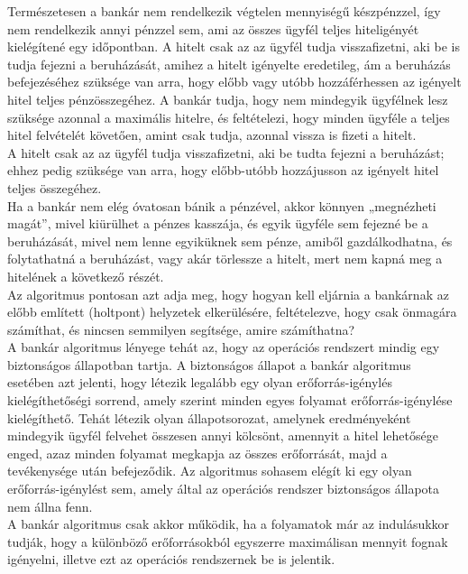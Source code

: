 \documentclass[tikz,12pt,margin=0px]{article}
\begin{document}
    \noindent Természetesen a bankár nem rendelkezik végtelen mennyiségű készpénzzel, így nem rendelkezik annyi pénzzel sem, ami az összes ügyfél teljes hiteligényét kielégítené egy időpontban. A hitelt csak az az ügyfél tudja visszafizetni, aki be is tudja fejezni a beruházását, amihez a hitelt igényelte eredetileg, ám a beruházás befejezéséhez szüksége van arra, hogy előbb vagy utóbb hozzáférhessen az igényelt hitel teljes pénzösszegéhez. A bankár tudja, hogy nem mindegyik ügyfélnek lesz szüksége azonnal a maximális hitelre, és feltételezi, hogy minden ügyféle a teljes hitel felvételét követően, amint csak tudja, azonnal vissza is fizeti a hitelt.\\

    \noindent A hitelt csak az az ügyfél tudja visszafizetni, aki be tudta fejezni a beruházást; ehhez pedig szüksége van arra, hogy előbb-utóbb hozzájusson az igényelt hitel teljes összegéhez.\\

    \noindent Ha a bankár nem elég óvatosan bánik a pénzével, akkor könnyen „megnézheti magát”, mivel kiürülhet a pénzes kasszája, és egyik ügyféle sem fejezné be a beruházását, mivel nem lenne egyiküknek sem pénze, amiből gazdálkodhatna, és folytathatná a beruházást, vagy akár törlessze a hitelt, mert nem kapná meg a hitelének a következő részét.\\

    \noindent Az algoritmus pontosan azt adja meg, hogy hogyan kell eljárnia a bankárnak az előbb említett (holtpont) helyzetek elkerülésére, feltételezve, hogy csak önmagára számíthat, és nincsen semmilyen segítsége, amire számíthatna?\\

    \noindent A bankár algoritmus lényege tehát az, hogy az operációs rendszert mindig egy biztonságos állapotban tartja. A biztonságos állapot a bankár algoritmus esetében azt jelenti, hogy létezik legalább egy olyan erőforrás-igénylés kielégíthetőségi sorrend, amely szerint minden egyes folyamat erőforrás-igénylése kielégíthető. Tehát létezik olyan állapotsorozat, amelynek eredményeként mindegyik ügyfél felvehet összesen annyi kölcsönt, amennyit a hitel lehetősége enged, azaz minden folyamat megkapja az összes erőforrását, majd a tevékenysége után befejeződik. Az algoritmus sohasem elégít ki egy olyan erőforrás-igénylést sem, amely által az operációs rendszer biztonságos állapota nem állna fenn.\\

    \noindent A bankár algoritmus csak akkor működik, ha a folyamatok már az indulásukkor tudják, hogy a különböző erőforrásokból egyszerre maximálisan mennyit fognak igényelni, illetve ezt az operációs rendszernek be is jelentik.\\
\end{document}
